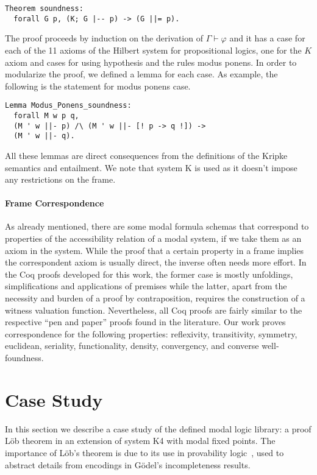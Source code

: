 \documentclass[sigconf]{acmart}
\begin{document}
\begin{verbatim}
Theorem soundness:
  forall G p, (K; G |-- p) -> (G ||= p).
\end{verbatim}

The proof proceeds by induction on the derivation of $\Gamma \vdash\varphi$ and
it has a case for each of the 11 axioms of the Hilbert system for propositional
logics, one for the $K$ axiom and cases for using hypothesis and the rules modus
ponens. In order to modularize the proof, we defined a lemma for each case.
As example, the following is the statement for modus ponens case.
\begin{verbatim}
Lemma Modus_Ponens_soundness:
  forall M w p q,
  (M ' w ||- p) /\ (M ' w ||- [! p -> q !]) ->
  (M ' w ||- q).
\end{verbatim}
All these lemmas are direct consequences from the definitions of the Kripke
semantics and entailment. We note that system K is used as it doesn't impose
any restrictions on the frame.

\paragraph{Frame Correspondence} 
As already mentioned, there are some modal formula schemas that correspond
to properties of the accessibility relation of a modal system, if we take them
as an axiom in the system.  While the proof that a certain property in a frame
implies the correspondent axiom is usually  direct, the inverse often needs
more effort. In the Coq proofs developed for this work,  the former case is
mostly unfoldings, simplifications and applications of premises
while the latter, apart from the necessity and burden of a proof by contraposition, 
requires the construction of a witness valuation function. 
Nevertheless, all Coq proofs are fairly similar to the respective
``pen and paper'' proofs found in the literature. 
Our work proves correspondence for the following properties: reflexivity,
transitivity, symmetry,  euclidean, seriality, functionality, density, convergency,
and converse well-foundness.

\section{Case Study}\label{sec:case}

In this section we describe a case study of the defined modal logic library:
a proof L\"ob theorem in an extension of system K4 with modal fixed points.
The importance of L\"ob's theorem is due to its use in provability
logic~\cite{boolos_1994}, used to abstract details from encodings in G\"odel's
incompleteness results.
\end{document}
